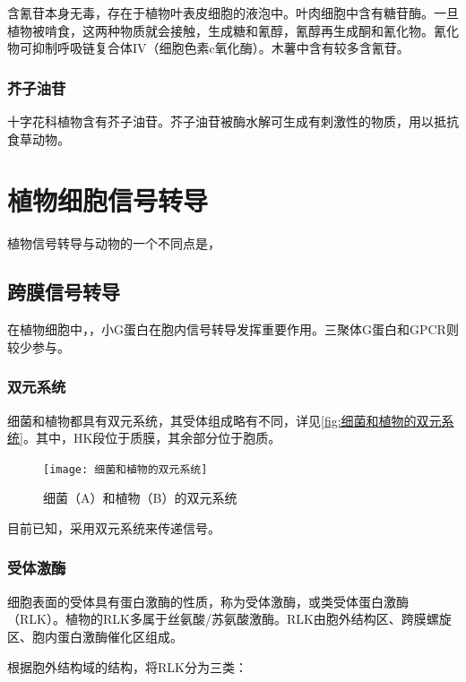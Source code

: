 含氰苷本身无毒，存在于植物叶表皮细胞的液泡中。叶肉细胞中含有糖苷酶。一旦植物被啃食，这两种物质就会接触，生成糖和氰醇，氰醇再生成酮和氰化物。氰化物可抑制呼吸链复合体IV（细胞色素c氧化酶）。木薯中含有较多含氰苷。

\subsubsection{芥子油苷}

十字花科植物含有芥子油苷。芥子油苷被酶水解可生成有刺激性的物质，用以抵抗食草动物。

\section{植物细胞信号转导}

植物信号转导与动物的一个不同点是，

\subsection{跨膜信号转导}

在植物细胞中，，小G蛋白在胞内信号转导发挥重要作用。三聚体G蛋白和GPCR则较少参与。

\subsubsection{双元系统}

细菌和植物都具有双元系统，其受体组成略有不同，详见\autoref{fig:细菌和植物的双元系统}。其中，HK段位于质膜，其余部分位于胞质。

\begin{figure}[htbp]
	\centering
	\texttt{[image: 细菌和植物的双元系统]}
	\caption{细菌（A）和植物（B）的双元系统}
	\label{fig:细菌和植物的双元系统}
\end{figure}

目前已知，采用双元系统来传递信号。

\subsubsection{受体激酶}

细胞表面的受体具有蛋白激酶的性质，称为受体激酶，或类受体蛋白激酶（RLK）。植物的RLK多属于丝氨酸/苏氨酸激酶。RLK由胞外结构区、跨膜螺旋区、胞内蛋白激酶催化区组成。

根据胞外结构域的结构，将RLK分为三类：

